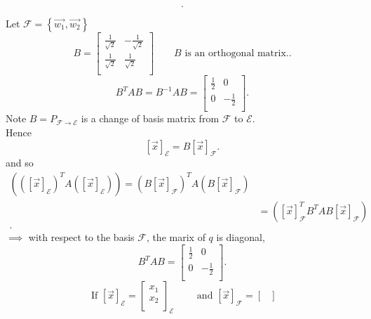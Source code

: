 \documentclass{report}
\begin{document}
{\[          .\] 
   
          Let $ \mathcal{F} = \left\{ \vec{ w_1} ,\vec{ w_2}  \right\} $ \\
          \[
          B = \begin{bmatrix}
          \frac{1}{ \sqrt{2} } & - \frac{1}{ \sqrt{2} }\\
          \frac{1}{ \sqrt{2} } & \frac{1}{ \sqrt{2} }\\
          \end{bmatrix}             \qquad  B \text{ is an orthogonal matrix.}
          .\]
          \[
          B ^{ T} A B = B ^{-1} A B = \begin{bmatrix}
          \frac{1}{2} & 0\\
          0 & - \frac{1}{2}\\
          \end{bmatrix}
          .\] 
          Note $ B = P _{ \mathcal{F} \to \mathcal{E}}$ is a change of basis matrix from $ \mathcal{F} $ to $ \mathcal{E}$.\\
          Hence
          \[
           \left[ \vec{ x}  \right] _{ \mathcal{E}} = B \left[ \vec{ x}  \right] _{ \mathcal{F}} 
          .\] 
          and so 
          \begin{align*}
           \left( \left( \left[ \vec{ x}  \right] _{ \mathcal{E}}\right) ^{T} A \left( \left[ \vec{ x}  \right] _{ \mathcal{E}}\right)  \right) = \left( B \left[ \vec{ x}  \right] _{ \mathcal{F}}\right) ^{T} A \left( B \left[ \vec{ x}  \right] _{ \mathcal{F}}\right)\\
           &= \left( \left[ \vec{ x}  \right] _{ \mathcal{F}} ^{T} B ^{T} A B \left[ \vec{ x}  \right] _{ \mathcal{F}} \right)\\
          .\end{align*}
          $ \implies$ with respect to the basis $ \mathcal{F}$, the marix of $ q$ is diagonal,
          \[
          B ^{T} A B = \begin{bmatrix}
          \frac{1}{2} & 0\\
          0 & - \frac{1}{2}\\
          \end{bmatrix}
          .\]
          \[
           \text{ If } \left[ \vec{ x}  \right] _{ \mathcal{E}} = \begin{bmatrix}
           x_1\\
           x_2\\
           \end{bmatrix}
           _{ \mathcal{E}} \qquad  \text{ and } \left[ \vec{ x}  \right] _{ \mathcal{F}} = \begin{bmatrix}

\end{bmatrix}\]}
\end{document}
